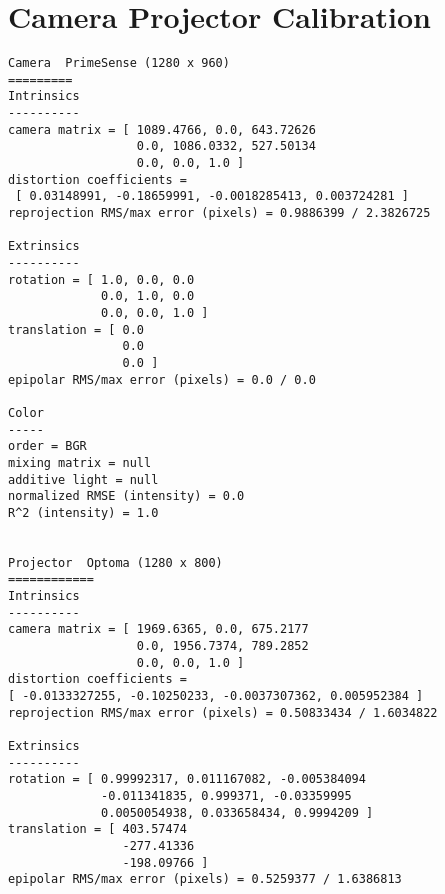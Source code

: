 \section{Camera Projector Calibration}\label{apx:calib}
\begin{verbatim}
Camera  PrimeSense (1280 x 960)
=========
Intrinsics
----------
camera matrix = [ 1089.4766, 0.0, 643.72626
                  0.0, 1086.0332, 527.50134
                  0.0, 0.0, 1.0 ]
distortion coefficients =
 [ 0.03148991, -0.18659991, -0.0018285413, 0.003724281 ]
reprojection RMS/max error (pixels) = 0.9886399 / 2.3826725

Extrinsics
----------
rotation = [ 1.0, 0.0, 0.0
             0.0, 1.0, 0.0
             0.0, 0.0, 1.0 ]
translation = [ 0.0
                0.0
                0.0 ]
epipolar RMS/max error (pixels) = 0.0 / 0.0

Color
-----
order = BGR
mixing matrix = null
additive light = null
normalized RMSE (intensity) = 0.0
R^2 (intensity) = 1.0


Projector  Optoma (1280 x 800)
============
Intrinsics
----------
camera matrix = [ 1969.6365, 0.0, 675.2177
                  0.0, 1956.7374, 789.2852
                  0.0, 0.0, 1.0 ]
distortion coefficients = 
[ -0.0133327255, -0.10250233, -0.0037307362, 0.005952384 ]
reprojection RMS/max error (pixels) = 0.50833434 / 1.6034822

Extrinsics
----------
rotation = [ 0.99992317, 0.011167082, -0.005384094
             -0.011341835, 0.999371, -0.03359995
             0.0050054938, 0.033658434, 0.9994209 ]
translation = [ 403.57474
                -277.41336
                -198.09766 ]
epipolar RMS/max error (pixels) = 0.5259377 / 1.6386813
\end{verbatim}